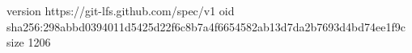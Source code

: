 version https://git-lfs.github.com/spec/v1
oid sha256:298abbd0394011d5425d22f6c8b7a4f6654582ab13d7da2b7693d4bd74ee1f9c
size 1206
